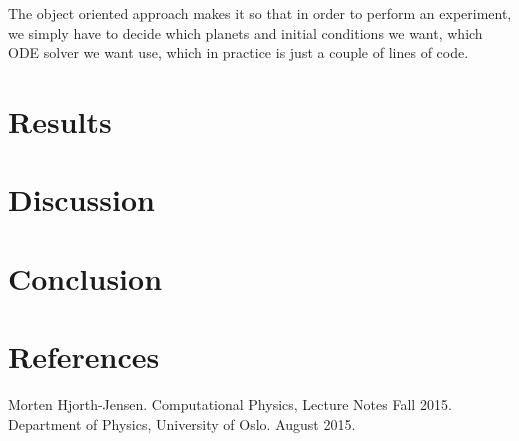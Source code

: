 \documentclass[norsk,a4paper,12pt]{article}
\begin{document}
{The object oriented approach makes it so that in order to perform an experiment, we simply have to decide which planets and initial conditions we want, which ODE solver we want use, which in practice is just a couple of lines of code.
\section{Results}
\section{Discussion}
\section{Conclusion}
\section{References}
\begingroup
\renewcommand{\section}[2]{}
\begin{thebibliography}{}
  Morten Hjorth-Jensen.
  Computational Physics, Lecture Notes Fall 2015.
  Department of Physics, University of Oslo.
  August 2015.
\end{thebibliography}
\endgroup
\end{document}
